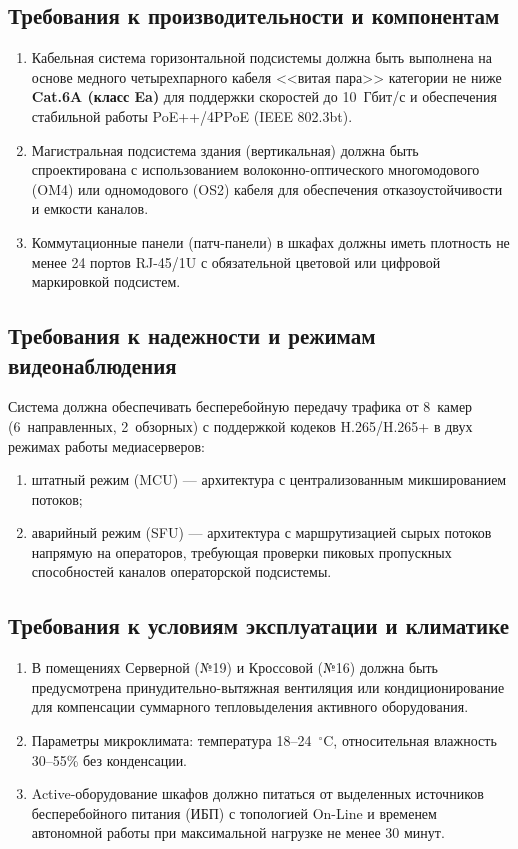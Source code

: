 \documentclass{bmstu}
\begin{document}
\begin{appendices}
\subsection{Требования к производительности и компонентам}
\begin{enumerate}[label=\thesection.\arabic*]
    \item Кабельная система горизонтальной подсистемы должна быть выполнена на основе медного четырехпарного кабеля <<витая пара>> категории не ниже \textbf{Cat.6A (класс Ea)} для поддержки скоростей до 10~Гбит/с и обеспечения стабильной работы PoE++/4PPoE (IEEE 802.3bt).
    \item Магистральная подсистема здания (вертикальная) должна быть спроектирована с использованием волоконно-оптического многомодового (OM4) или одномодового (OS2) кабеля для обеспечения отказоустойчивости и емкости каналов.
    \item Коммутационные панели (патч-панели) в шкафах должны иметь плотность не менее 24 портов RJ-45/1U с обязательной цветовой или цифровой маркировкой подсистем.
\end{enumerate}

\subsection{Требования к надежности и режимам видеонаблюдения}
Система должна обеспечивать бесперебойную передачу трафика от 8~камер (6~направленных, 2~обзорных) с поддержкой кодеков H.265/H.265+ в двух режимах работы медиасерверов:
\begin{enumerate}[label=\asbuk*)]
    \item штатный режим (MCU) --- архитектура с централизованным микшированием потоков;
    \item аварийный режим (SFU) --- архитектура с маршрутизацией сырых потоков напрямую на операторов, требующая проверки пиковых пропускных способностей каналов операторской подсистемы.
\end{enumerate}

\subsection{Требования к условиям эксплуатации и климатике}
\begin{enumerate}[label=\thesection.\arabic*]
    \item В помещениях Серверной (№19) и Кроссовой (№16) должна быть предусмотрена принудительно-вытяжная вентиляция или кондиционирование для компенсации суммарного тепловыделения активного оборудования.
    \item Параметры микроклимата: температура 18--24~$^\circ$C, относительная влажность 30--55\% без конденсации.
    \item Active-оборудование шкафов должно питаться от выделенных источников бесперебойного питания (ИБП) с топологией On-Line и временем автономной работы при максимальной нагрузке не менее 30 минут.
\end{enumerate}


\end{appendices}
\end{document}
